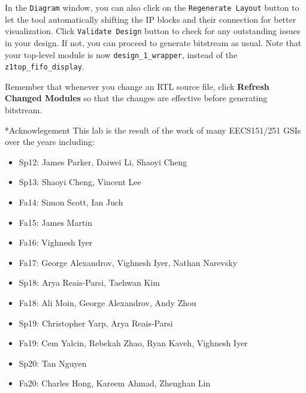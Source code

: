 \documentclass[11pt]{article}
\makeatletter
\renewcommand{\section}
{\@startsection {section}{1}{0pt}
 {-2ex}
 {1ex}
 {\bfseries\Large}}
\makeatother
\begin{document}
In the \texttt{Diagram} window, you can also click on the \texttt{Regenerate Layout} button to let the tool automatically shifting the IP blocks and their connection for better visualization. Click \texttt{Validate Design} button to check for any outstanding issues in your design. If not, you can proceed to generate bitstream as usual. Note that your top-level module is now \verb|design_1_wrapper|, instead of the \verb|z1top_fifo_display|.

\begin{center}
\end{center}

Remember that whenever you change an RTL source file, click \textbf{Refresh Changed Modules} so that the changes are effective before generating bitstream.

\section*{Acknowlegement}
This lab is the result of the work of many EECS151/251 GSIs over the years including:
\begin{itemize}
\item Sp12: James Parker, Daiwei Li, Shaoyi Cheng
\item Sp13: Shaoyi Cheng, Vincent Lee
\item Fa14: Simon Scott, Ian Juch
\item Fa15: James Martin
\item Fa16: Vighnesh Iyer
\item Fa17: George Alexandrov, Vighnesh Iyer, Nathan Narevsky
\item Sp18: Arya Reais-Parsi, Taehwan Kim
\item Fa18: Ali Moin, George Alexandrov, Andy Zhou
\item Sp19: Christopher Yarp, Arya Reais-Parsi
\item Fa19: Cem Yalcin, Rebekah Zhao, Ryan Kaveh, Vighnesh Iyer
\item Sp20: Tan Nguyen
\item Fa20: Charles Hong, Kareem Ahmad, Zhenghan Lin

\end{itemize}
\end{document}
